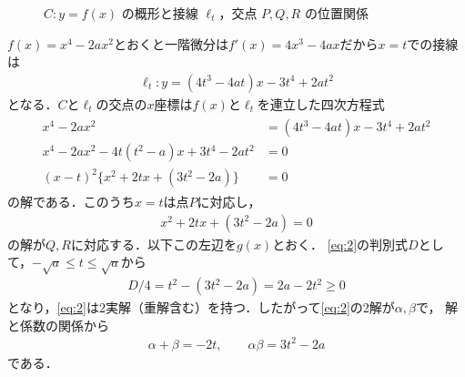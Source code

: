 \documentclass[../../main.tex]{subfiles}
\begin{document}
\begin{figure}[htb]
\begin{center}
  \end{center}
  \caption{$C: y=f(x)$ の概形と接線 $\ell_t$，交点 $P, Q, R$ の位置関係}
\end{figure}

$f(x)=x^4-2ax^2$とおくと一階微分は$f'(x)=4x^3-4ax$だから$x=t$での接線は
\begin{align}
  \ell_t: y=(4t^3-4at)x-3t^4+2at^2 \label{eq:1}
\end{align}
となる．$C$と$\ell_t$の交点の$x$座標は$f(x)$と$\ell_t$を連立した四次方程式
\begin{align}
  \begin{split}
    x^4-2ax^2&=(4t^3-4at)x-3t^4+2at^2 \\
    x^4-2ax^2-4t(t^2-a)x+3t^4-2at^2&=0 \\
    (x-t)^2\{x^2+2tx+(3t^2-2a)\}&=0
  \end{split}
\end{align}
の解である．このうち$x=t$は点$P$に対応し，
\begin{align}
  x^2+2tx+(3t^2-2a)=0 \label{eq:2}
\end{align}
の解が$Q,R$に対応する．以下この左辺を$g(x)$とおく．
\cref{eq:2}の判別式$D$として，$-\sqrt{a}\le t\le\sqrt{a}$から
\begin{align}
  D/4=t^2-(3t^2-2a)=2a-2t^2 \ge 0
\end{align}
となり，\cref{eq:2}は2実解（重解含む）を持つ．したがって\cref{eq:2}の2解が$\alpha,\beta$で，
解と係数の関係から
\begin{align}
  \alpha+\beta=-2t, \qquad \alpha\beta=3t^2-2a \label{eq:3}
\end{align}
である．
\end{document}
